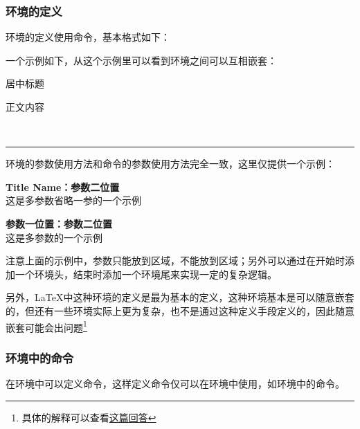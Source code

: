     \subsubsection{环境的定义}
    环境的定义使用命令，基本格式如下：
    \begin{texcode}
        \newenvironment{name}[num][default]{before}{after}
    \end{texcode}
    一个示例如下，从这个示例里可以看到环境之间可以互相嵌套：
    \begin{texshow}
        \newenvironment{titleenv}
        {
            \begin{center}居中标题\end{center}
        }
        {
            \\\rule{\textwidth}{1mm}
        }

        \begin{titleenv}
            正文内容
        \end{titleenv}
    \end{texshow}

    环境的参数使用方法和命令的参数使用方法完全一致，这里仅提供一个示例：
    \begin{texshow}
        \newenvironment{king}[2][Title Name]
        {
            \begin{center} \textbf{#1：#2}\\
        }
        {
            \end{center}
        }
        \begin{king}{参数二位置}
            这是多参数省略一参的一个示例
        \end{king}
        \begin{king}[参数一位置]{参数二位置}
            这是多参数的一个示例
        \end{king}
    \end{texshow}
    注意上面的示例中，参数只能放到区域，不能放到区域；另外可以通过在开始时添加一个环境头，结束时添加一个环境尾来实现一定的复杂逻辑。

    另外，\LaTeX{}中这种环境的定义是最为基本的定义，这种环境基本是可以随意嵌套的，但还有一些环境实际上更为复杂，也不是通过这种定义手段定义的，因此随意嵌套可能会出问题\footnote{具体的解释可以查看\href{https://www.zhihu.com/question/68657047/answer/266169094}{这篇回答}}
    

    \subsubsection{环境中的命令}
    在环境中可以定义命令，这样定义命令仅可以在环境中使用，如环境中的命令。
    
